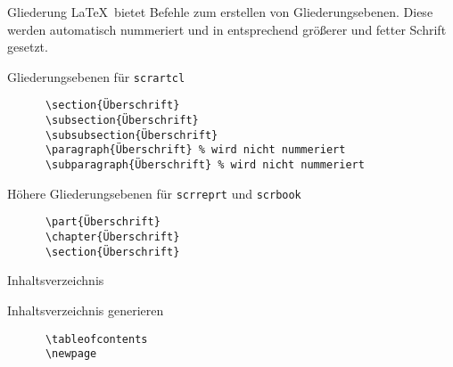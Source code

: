 \begin{frame}[fragile]{Gliederung}
  \LaTeX\ bietet Befehle zum erstellen von Gliederungsebenen.
  Diese werden automatisch nummeriert und in entsprechend größerer und fetter Schrift gesetzt.

  \begin{block}{Gliederungsebenen für \texttt{scrartcl}}
    \begin{lstlisting}
      \section{Überschrift}
      \subsection{Überschrift}
      \subsubsection{Überschrift}
      \paragraph{Überschrift} % wird nicht nummeriert
      \subparagraph{Überschrift} % wird nicht nummeriert
    \end{lstlisting}
  \end{block}
  \begin{block}{Höhere Gliederungsebenen für \texttt{scrreprt} und \texttt{scrbook}}
    \begin{lstlisting}
      \part{Überschrift}
      \chapter{Überschrift}
      \section{Überschrift}
    \end{lstlisting}
  \end{block}
\end{frame}

\begin{frame}[fragile]{Inhaltsverzeichnis}
  \begin{block}{Inhaltsverzeichnis generieren}
    \begin{lstlisting}
      \tableofcontents
      \newpage
    \end{lstlisting}
  \end{block}
\end{frame}

